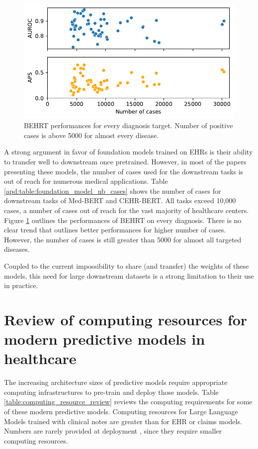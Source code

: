 \documentclass[french,12pt,twoside,a4paper]{book}
\begin{document}
\begin{appendices}
  \begin{figure}[htbp]
    \begin{center}
      \includegraphics[width=0.9\linewidth]{img/chapter_3/behrt-performances.pdf}
    \end{center}
    \caption{BEHRT \citep{li2020behrt} performances for every diagnosis target.
      Number of positive cases is above 5000 for almost every disease.}
    \label{apd:fig:behrt_performances}
  \end{figure}


  A strong argument in favor of foundation models trained on EHRs is their
  ability to transfer well to downstream once pretrained. However, in most of the
  papers presenting these models, the number of cases used for the downstream
  tasks is out of reach for numerous medical applications. Table
  \ref{apd:table:foundation_model_nb_cases} shows the number of cases for
  downstream tasks of Med-BERT and CEHR-BERT. All tasks exceed 10,000 cases, a
  number of cases out of reach for the vast majority of healthcare centers. Figure
  \ref{apd:fig:behrt_performances} outlines the performances of BEHRT on every
  diagnosis. There is no clear trend that outlines better performances for higher
  number of cases. However, the number of cases is still greater than 5000 for
  almost all targeted diseases.

  Coupled to the current impossibility to share (and transfer) the weights of
  these models, this need for large downstream datasets is a strong limitation to
  their use in practice.


  \section{Review of computing resources for modern predictive models in healthcare}%
  \label{apd:computing_resources_review}

  The increasing architecture sizes of predictive models require appropriate
  computing infrastructures to pre-train and deploy those models. Table
  \ref{table:computing_resource_review} reviews the computing requirements for some
  of these modern predictive models. Computing resources for Large Language Models
  trained with clinical notes are greater than for EHR or claims models. Numbers
  are rarely provided at deployment , since they require smaller computing
  resources.



\end{appendices}
\end{document}
